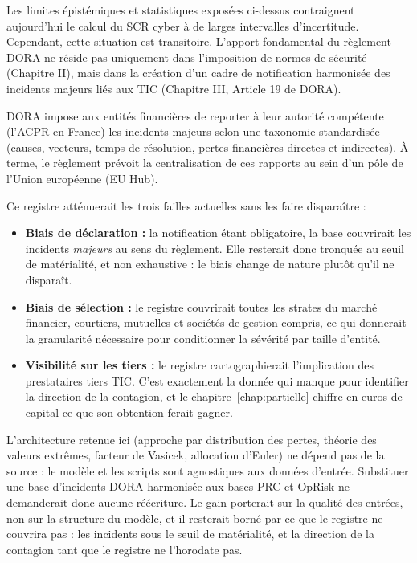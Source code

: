 
Les limites épistémiques et statistiques exposées ci-dessus contraignent aujourd'hui le calcul du SCR cyber à de larges intervalles d'incertitude. Cependant, cette situation est transitoire. L'apport fondamental du règlement DORA ne réside pas uniquement dans l'imposition de normes de sécurité (Chapitre II), mais dans la création d'un cadre de notification harmonisée des incidents majeurs liés aux TIC (Chapitre III, Article 19 de DORA).

DORA impose aux entités financières de reporter à leur autorité compétente (l'ACPR en France) les incidents majeurs selon une taxonomie standardisée (causes, vecteurs, temps de résolution, pertes financières directes et indirectes). À terme, le règlement prévoit la centralisation de ces rapports au sein d'un pôle de l'Union européenne (EU Hub).

Ce registre atténuerait les trois failles actuelles sans les faire disparaître :
\begin{itemize}
    \item \textbf{Biais de déclaration :} la notification étant obligatoire, la base couvrirait
      les incidents \emph{majeurs} au sens du règlement. Elle resterait donc tronquée au seuil
      de matérialité, et non exhaustive : le biais change de nature plutôt qu'il ne disparaît.
    \item \textbf{Biais de sélection :} le registre couvrirait toutes les strates du marché
      financier, courtiers, mutuelles et sociétés de gestion compris, ce qui donnerait la
      granularité nécessaire pour conditionner la sévérité par taille d'entité.
    \item \textbf{Visibilité sur les tiers :} le registre cartographierait l'implication des
      prestataires tiers TIC. C'est exactement la donnée qui manque pour identifier la direction
      de la contagion, et le chapitre~\ref{chap:partielle} chiffre en euros de capital ce que
      son obtention ferait gagner.
\end{itemize}

L'architecture retenue ici (approche par distribution des pertes, théorie des valeurs
extrêmes, facteur de Vasicek, allocation d'Euler) ne dépend pas de la source : le modèle et les
scripts sont agnostiques aux données d'entrée. Substituer une base d'incidents DORA harmonisée
aux bases PRC et OpRisk ne demanderait donc aucune réécriture. Le gain porterait sur la qualité
des entrées, non sur la structure du modèle, et il resterait borné par ce que le registre ne
couvrira pas : les incidents sous le seuil de matérialité, et la direction de la contagion tant
que le registre ne l'horodate pas.

